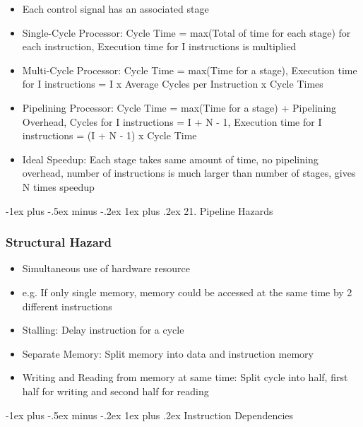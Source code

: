 \documentclass[10pt, portrait]{article}
\makeatletter
\renewcommand{\subsection}{\@startsection{subsection}{3}{0mm}%
                                {-1ex plus -.5ex minus -.2ex}%
                                {1ex plus .2ex}%
                                {\normalfont\small\bfseries}}%
\makeatother
\begin{document}
\begin{multicols*}{2}
\begin{itemize}
\begin{itemize}
    \end{itemize}
    \item Each control signal has an associated stage
    \item Single-Cycle Processor: Cycle Time = max(Total of time for each stage) for each instruction, Execution time for I instructions is multiplied
    \item Multi-Cycle Processor: Cycle Time = max(Time for a stage), Execution time for I instructions = I x Average Cycles per Instruction x Cycle Times
    \item Pipelining Processor: Cycle Time = max(Time for a stage) + Pipelining Overhead, Cycles for I instructions = I + N - 1, Execution time for I instructions = (I + N - 1) x Cycle Time
    \item Ideal Speedup: Each stage takes same amount of time, no pipelining overhead, number of instructions is much larger than number of stages, gives N times speedup
\end{itemize}

\subsection{21. Pipeline Hazards}
\subsubsection{Structural Hazard}
\begin{itemize}
    \item Simultaneous use of hardware resource
    \item e.g. If only single memory, memory could be accessed at the same time by 2 different instructions
    \item Stalling: Delay instruction for a cycle
    \item Separate Memory: Split memory into data and instruction memory
    \item Writing and Reading from memory at same time: Split cycle into half, first half for writing and second half for reading
\end{itemize}

\subsection{Instruction Dependencies}

\end{multicols*}
\end{document}
